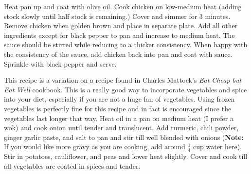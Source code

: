 \documentclass[oneside]{recipe}
\begin{document}
Heat pan up and coat with olive oil. Cook chicken on low-medium heat (adding stock slowly until half stock is remaining.) Cover and simmer for 3 minutes. Remove chicken when golden brown and place in separate plate. Add all other ingredients except for black pepper to pan and increase to medium heat. The sauce should be stirred while reducing to a thicker consistency. When happy with the consistency of the sauce, add chicken back into pan and coat with sauce. Sprinkle with black pepper and serve. 

This recipe is a variation on a recipe found in Charles Mattock's \textit{Eat Cheap but Eat Well} cookbook. This is a really good way to incorporate vegetables and spice into your diet, especially if you are not a huge fan of vegetables. Using frozen vegetables is perfectly fine for this recipe and in fact is encouraged since the vegetables last longer that way. 
Heat oil in a pan on medium heat (I prefer a wok) and cook onion until tender and translucent. Add turmeric, chili powder, ginger garlic paste, and salt to pan and stir till well blended with onions (\textbf{Note:} If you would like more gravy as you are cooking, add around $\frac{1}{4}$ cup water here). Stir in potatoes, cauliflower, and peas and lower heat slightly. Cover and cook till all vegetables are coated in spices and tender. 
\end{document}

